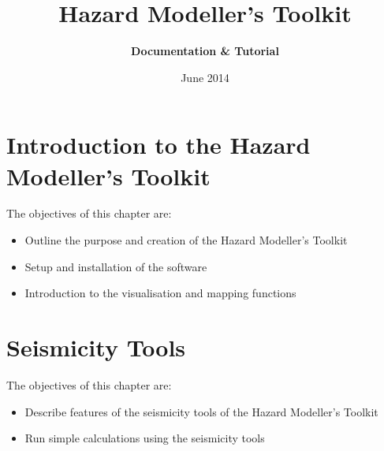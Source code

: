 \documentclass[11pt,a4paper,headings=small,dvips]{scrbook}
\newenvironment{myfancybox}{%
  \def\FrameCommand{\fboxsep=\FrameSep \fcolorbox{blue01}{honeydew}}%
  \color{black}\MakeFramed {\FrameRestore}}%
 {\endMakeFramed}
\begin{document}
\setcounter{page}{1}
\lstset{language=Python}

\begin{titlepage}
	\title{ \textcolor{blue01}{\textsf{\bfseries\Huge 
        Hazard Modeller's Toolkit
        }}}
	\subtitle{ \textcolor{blue01}{\textsf{\bfseries\LARGE
        Documentation \& Tutorial}}}
	\date{June 2014}
 
	\publishers{GEM Foundation, Pavia}
\end{titlepage}
\pagestyle{scrheadings}
\maketitle
%
\tableofcontents
\cleardoublepage
% 
\chapter{Introduction to the Hazard Modeller's Toolkit}
\begin{myfancybox}
The objectives of this chapter are:
\begin{itemize}
    \item Outline the purpose and creation of the Hazard Modeller's Toolkit 
    \item Setup and installation of the software
    \item Introduction to the visualisation and mapping functions
\end{itemize}
\end{myfancybox}
  
\cleardoublepage

\chapter{Seismicity Tools}
\begin{myfancybox}
The objectives of this chapter are:
\begin{itemize}
    \item Describe features of the seismicity tools of the Hazard Modeller's Toolkit 
    \item Run simple calculations using the seismicity tools
\end{itemize}
\end{myfancybox}
  
\cleardoublepage
\end{document}

